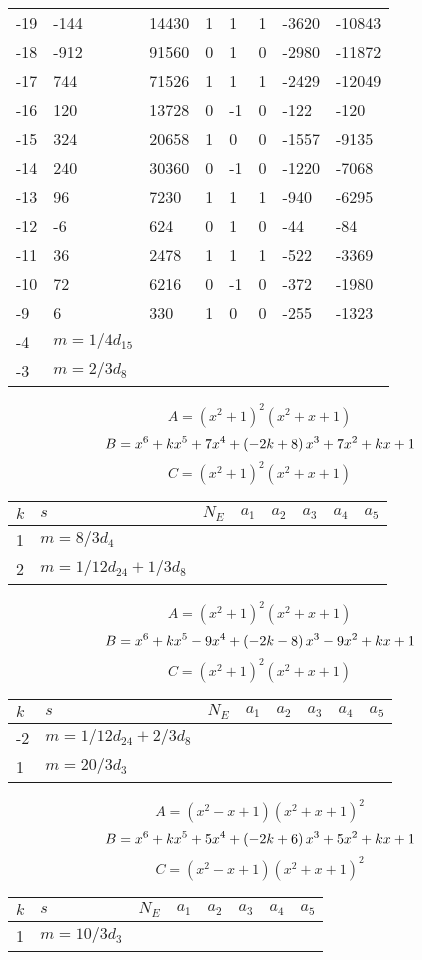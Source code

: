 \documentclass{amsart}
\begin{document}
\begin{longtable}{|l|l|l|lllll|}
-19&-144&14430&1&1&1&-3620&-10843\\
-18&-912&91560&0&1&0&-2980&-11872\\
-17&744&71526&1&1&1&-2429&-12049\\
-16&120&13728&0&-1&0&-122&-120\\
-15&324&20658&1&0&0&-1557&-9135\\
-14&240&30360&0&-1&0&-1220&-7068\\
-13&96&7230&1&1&1&-940&-6295\\
-12&-6&624&0&1&0&-44&-84\\
-11&36&2478&1&1&1&-522&-3369\\
-10&72&6216&0&-1&0&-372&-1980\\
-9&6&330&1&0&0&-255&-1323\\
-4&$m=1/4d_{15}$&&\multicolumn{5}{c|}{}\\
-3&$m=2/3d_{8}$&&\multicolumn{5}{c|}{}\\
\hline
\end{longtable}
$$A=(x^2
 + 1)^{2}(x^2
 + x
 + 1)$$
$$B=x^6
 + k\*x^5
 + 7\*x^4
 + \left(-2\*k
 + 8\right) \*x^3
 + 7\*x^2
 + k\*x
 + 1$$
$$C=(x^2
 + 1)^{2}(x^2
 + x
 + 1)$$
\begin{longtable}{|l|l|l|lllll|}
\hline
$k$ & $s$ & $N_E$ & $a_1$ & $a_2$ & $a_3$ & $a_4$ & $a_5$\\
\hline
1&$m=8/3d_{4}$&&\multicolumn{5}{c|}{}\\
2&$m=1/12d_{24}+1/3d_{8}$&&\multicolumn{5}{c|}{}\\
\hline
\end{longtable}
$$A=(x^2
 + 1)^{2}(x^2
 + x
 + 1)$$
$$B=x^6
 + k\*x^5
 - 9\*x^4
 + \left(-2\*k
 - 8\right) \*x^3
 - 9\*x^2
 + k\*x
 + 1$$
$$C=(x^2
 + 1)^{2}(x^2
 + x
 + 1)$$
\begin{longtable}{|l|l|l|lllll|}
\hline
$k$ & $s$ & $N_E$ & $a_1$ & $a_2$ & $a_3$ & $a_4$ & $a_5$\\
\hline
-2&$m=1/12d_{24}+2/3d_{8}$&&\multicolumn{5}{c|}{}\\
1&$m=20/3d_{3}$&&\multicolumn{5}{c|}{}\\
\hline
\end{longtable}
$$A=(x^2
 - x
 + 1)(x^2
 + x
 + 1)^{2}$$
$$B=x^6
 + k\*x^5
 + 5\*x^4
 + \left(-2\*k
 + 6\right) \*x^3
 + 5\*x^2
 + k\*x
 + 1$$
$$C=(x^2
 - x
 + 1)(x^2
 + x
 + 1)^{2}$$
\begin{longtable}{|l|l|l|lllll|}
\hline
$k$ & $s$ & $N_E$ & $a_1$ & $a_2$ & $a_3$ & $a_4$ & $a_5$\\
\hline
1&$m=10/3d_{3}$&&\multicolumn{5}{c|}{}\\
\hline
\end{longtable}
\end{document}
